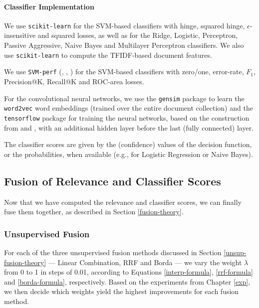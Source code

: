 \paragraph{Classifier Implementation}
We use \texttt{scikit-learn} \cite{scikit} for the SVM-based classifiers with hinge,
squared hinge, $\epsilon$-insensitive and squared losses, as well as for the Ridge, Logistic, Perceptron,
Passive Aggressive, Naive Bayes and Multilayer Perceptron classifiers.
We also use \texttt{scikit-learn} to compute the TFIDF-based document features.

We use \texttt{SVM-perf} (\cite{svmperf3}, \cite{svmperf1}, \cite{svmperf2})
for the SVM-based classifiers with zero/one, error-rate, $F_1$, Precision@K, Recall@K and ROC-area losses.

For the convolutional neural networks, we use the \texttt{gensim} package \cite{gensim} to learn the \texttt{word2vec}
word embeddings (trained over the entire document collection)
and the \texttt{tensorflow} package \cite{tf} for training the neural networks, based on the construction
from \cite{cnn} and \cite{cnn-code}, with an additional hidden layer before the last (fully connected) layer.

The classifier scores are given by the (confidence) values of the decision function, or the probabilities, when available (e.g.,
for Logistic Regression or Naive Bayes).

\subsection{Fusion of Relevance and Classifier Scores}
Now that we have computed the relevance and classifier scores, we can finally fuse them together,
as described in Section \ref{fusion-theory}.

\subsubsection{Unsupervised Fusion}\label{impl-unsup}
For each of the three unsupervised fusion methods discussed in Section \ref{unsup-fusion-theory}
--- Linear Combination, RRF and Borda --- we vary the weight $\lambda$ from 0 to 1 in steps of 0.01,
according to Equations \ref{interp-formula}, \ref{rrf-formula} and \ref{borda-formula}, respectively.
Based on the experiments from Chapter \ref{exp}, we then decide
which weights yield the highest improvements for each fusion method.


